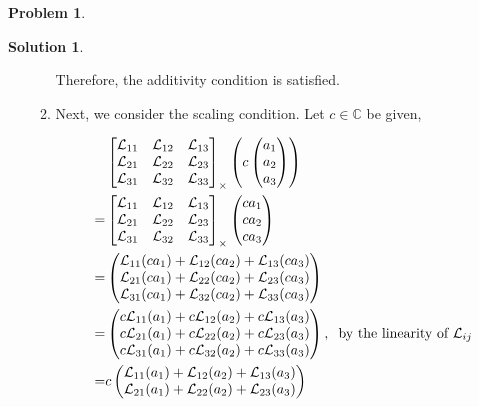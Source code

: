 \documentclass{article}
\theoremstyle{definition}
\newtheorem*{prob*}{Problem}
\newtheorem*{sln*}{Solution}
\newcommand{\lag}{\mathcal{L}}
\begin{document}
\begin{prob*}
\begin{sln*}
\begin{enumerate}
\begin{enumerate}
			Therefore, the additivity condition is satisfied. 
			
			\item Next, we consider the scaling condition. Let $c \in \mathbb{C}$ be given,
			
			
			\begin{align*}
			&\begin{bmatrix}
			\lag_{11} & \lag_{12} & \lag_{13}\\
			\lag_{21} & \lag_{22} & \lag_{23}\\
			\lag_{31} & \lag_{32} & \lag_{33}
			\end{bmatrix}_\times 
			\left(c\begin{pmatrix}
			a_1 \\ a_2 \\ a_3
			\end{pmatrix}\right) \\
			= 
			&\begin{bmatrix}
			\lag_{11} & \lag_{12} & \lag_{13}\\
			\lag_{21} & \lag_{22} & \lag_{23}\\
			\lag_{31} & \lag_{32} & \lag_{33}
			\end{bmatrix}_\times 
			\begin{pmatrix}
			ca_1 \\ ca_2 \\ ca_3
			\end{pmatrix}\\
			=
			&\begin{pmatrix}
			\lag_{11}(ca_1) + \lag_{12}(ca_2) + \lag_{13}(ca_3)\\
			\lag_{21}(ca_1) + \lag_{22}(ca_2) + \lag_{23}(ca_3)\\
			\lag_{31}(ca_1) + \lag_{32}(ca_2) + \lag_{33}(ca_3)
			\end{pmatrix} \\
			=
			& \begin{pmatrix}
			c\lag_{11}(a_1) + c\lag_{12}(a_2) + c\lag_{13}(a_3)\\
			c\lag_{21}(a_1) + c\lag_{22}(a_2) + c\lag_{23}(a_3)\\
			c\lag_{31}(a_1) + c\lag_{32}(a_2) + c\lag_{33}(a_3)
			\end{pmatrix},\hspace{0.2cm}\text{by the linearity of $\lag_{ij}$}\\
			=
			& c\begin{pmatrix}
			\lag_{11}(a_1) + \lag_{12}(a_2) + \lag_{13}(a_3)\\
			\lag_{21}(a_1) + \lag_{22}(a_2) + \lag_{23}(a_3)\\

\end{pmatrix}
\end{align*}
\end{enumerate}
\end{enumerate}
\end{sln*}
\end{prob*}
\end{document}
